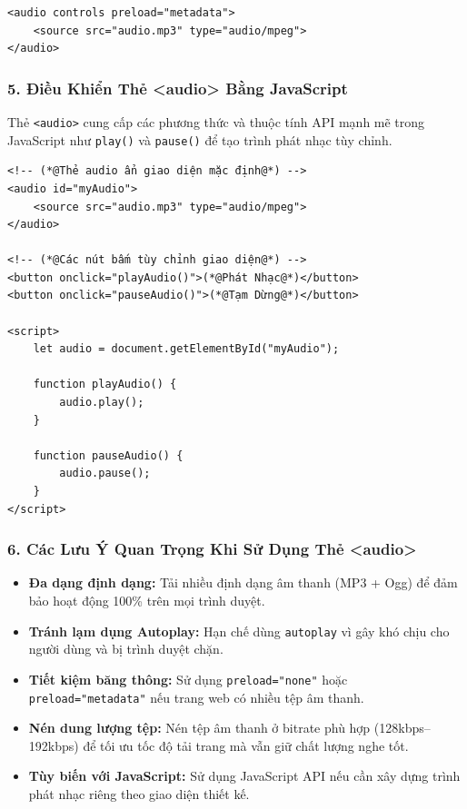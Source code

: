 \documentclass[11pt,oneside]{book}
\newcommand{\codeinline}[1]{\textcolor{accentOrange}{\texttt{#1}}}
\begin{document}
\begin{codeWindow}[Ví Dụ Tối Ưu Tải Âm Thanh Bằng preload="metadata"]
\begin{lstlisting}[language=HTML5]
<audio controls preload="metadata">
    <source src="audio.mp3" type="audio/mpeg">
</audio>
\end{lstlisting}
\end{codeWindow}

\subsubsection{5. Điều Khiển Thẻ <audio> Bằng JavaScript}

Thẻ \codeinline{<audio>} cung cấp các phương thức và thuộc tính API mạnh mẽ trong JavaScript như \codeinline{play()} và \codeinline{pause()} để tạo trình phát nhạc tùy chỉnh.

\begin{codeWindow}
\begin{lstlisting}[language=HTML5]
<!-- (*@Thẻ audio ẩn giao diện mặc định@*) -->
<audio id="myAudio">
    <source src="audio.mp3" type="audio/mpeg">
</audio>

<!-- (*@Các nút bấm tùy chỉnh giao diện@*) -->
<button onclick="playAudio()">(*@Phát Nhạc@*)</button>
<button onclick="pauseAudio()">(*@Tạm Dừng@*)</button>

<script>
    let audio = document.getElementById("myAudio");

    function playAudio() {
        audio.play();
    }

    function pauseAudio() {
        audio.pause();
    }
</script>
\end{lstlisting}
\end{codeWindow}

\subsubsection{6. Các Lưu Ý Quan Trọng Khi Sử Dụng Thẻ <audio>}

\begin{warnBox}
\begin{itemize}[leftmargin=1.5em, itemsep=3pt, parsep=0pt]
    \item \textbf{Đa dạng định dạng:} Tải nhiều định dạng âm thanh (MP3 + Ogg) để đảm bảo hoạt động 100\% trên mọi trình duyệt.
    \item \textbf{Tránh lạm dụng Autoplay:} Hạn chế dùng \codeinline{autoplay} vì gây khó chịu cho người dùng và bị trình duyệt chặn.
    \item \textbf{Tiết kiệm băng thông:} Sử dụng \codeinline{preload="none"} hoặc \codeinline{preload="metadata"} nếu trang web có nhiều tệp âm thanh.
    \item \textbf{Nén dung lượng tệp:} Nén tệp âm thanh ở bitrate phù hợp (128kbps--192kbps) để tối ưu tốc độ tải trang mà vẫn giữ chất lượng nghe tốt.
    \item \textbf{Tùy biến với JavaScript:} Sử dụng JavaScript API nếu cần xây dựng trình phát nhạc riêng theo giao diện thiết kế.
\end{itemize}
\end{warnBox}
\end{document}
